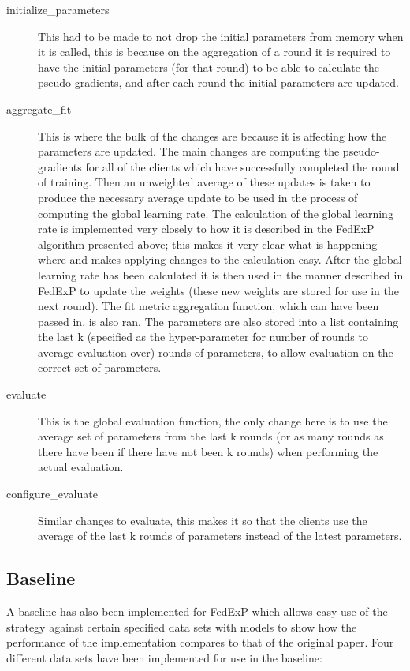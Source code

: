 \documentclass{article}
\begin{document}
\begin{description}
    \item[initialize\_parameters]{This had to be made to not drop the initial parameters from memory when it is called, this is because on the aggregation of a round it is required to have the initial parameters (for that round) to be able to calculate the pseudo-gradients, and after each round the initial parameters are updated.}
    \item[aggregate\_fit]{This is where the bulk of the changes are because it is affecting how the parameters are updated.  The main changes are computing the pseudo-gradients for all of the clients which have successfully completed the round of training.  Then an unweighted average of these updates is taken to produce the necessary average update to be used in the process of computing the global learning rate.  The calculation of the global learning rate is implemented very closely to how it is described in the FedExP algorithm presented above; this makes it very clear what is happening where and makes applying changes to the calculation easy.  After the global learning rate has been calculated it is then used in the manner described in FedExP to update the weights (these new weights are stored for use in the next round).  The fit metric aggregation function, which can have been passed in, is also ran.  The parameters are also stored into a list containing the last k (specified as the hyper-parameter for number of rounds to average evaluation over) rounds of parameters, to allow evaluation on the correct set of parameters.}
    \item[evaluate]{This is the global evaluation function, the only change here is to use the average set of parameters from the last k rounds (or as many rounds as there have been if there have not been k rounds) when performing the actual evaluation.}
    \item[configure\_evaluate]{Similar changes to evaluate, this makes it so that the clients use the average of the last k rounds of parameters instead of the latest parameters.}
\end{description}

\subsection{Baseline}

A baseline has also been implemented for FedExP which allows easy use of the strategy against certain specified data sets with models to show how the performance of the implementation compares to that of the original paper.  Four different data sets have been implemented for use in the baseline:
\end{document}
